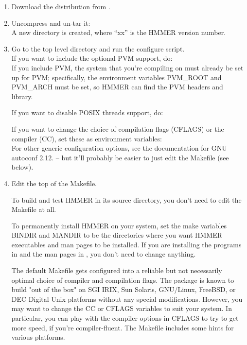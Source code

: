 \begin{enumerate}
\item Download the distribution from .

\item Uncompress and un-tar it:\\
A new directory  is created, where ``xx'' is
the HMMER version number.

\item Go to the top level directory and run the
      configure script.\\
If you want to include the optional PVM support, do:\\
If you include PVM, the system that you're compiling on must already
be set up for PVM; specifically, the environment variables PVM\_ROOT
and PVM\_ARCH must be set, so HMMER can find the PVM headers and
library.

If you want to disable POSIX threads support, do:\\

If you want to change the choice of compilation flags (CFLAGS) or the
compiler (CC), set these as environment variables:\\
For other generic configuration options, see the documentation for GNU
autoconf 2.12. -- but it'll probably be easier to just edit the
Makefile (see below).

\item Edit the top of the Makefile. 

To build and test HMMER in its source directory, you don't need to
edit the Makefile at all. 

To permanently install HMMER on your system, set the make variables
BINDIR and MANDIR to be the directories where you want HMMER
executables and man pages to be installed. If you are installing the
programs in  and the man pages in
, you don't need to change anything.

The default Makefile gets configured into a reliable but not
necessarily optimal choice of compiler and compilation flags. The
package is known to build "out of the box" on SGI IRIX, Sun Solaris,
GNU/Linux, FreeBSD, or DEC Digital Unix platforms without any special
modifications. However, you may want to change the CC or CFLAGS
variables to suit your system.  In particular, you can play with the
compiler options in CFLAGS to try to get more speed, if you're
compiler-fluent. The Makefile includes some hints for various
platforms. 


\end{enumerate}
